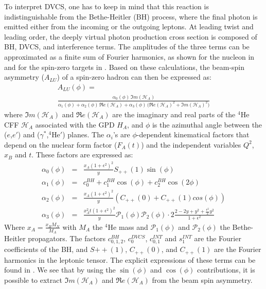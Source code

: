 \documentclass[preprint,nofootinbib,showpacs,prl,superscriptaddress,secnumarabic,amssymb,nobibnotes,aps,floatfix]{revtex4}
\begin{document}
To interpret DVCS, one has to keep in mind that this reaction is 
indistinguishable from the Bethe-Heitler (BH) process, where the final photon 
is emitted either from the incoming or the outgoing leptons. At leading twist 
and leading order, the deeply virtual photon production cross section is 
composed of BH, DVCS, and interference terms. The amplitudes of the 
three terms can be approximated as a finite sum of Fourier harmonics, as shown 
for the nucleon in \cite{Belitsky:2001ns} and for the spin-zero targets in 
\cite{Kirchner:2003wt,Belitsky:2008bz}. Based on these calculations, the 
beam-spin asymmetry ($A_{LU}$) of a spin-zero hadron can then be expressed as:
\small
\begin{equation}
\begin{split}
A_{LU}(\phi) =~~~~~~~~~~~~~~~~~~~~~~~~~~~~~~~~~~~~~~~~~~~~~~~~~~~~~~~~~\\
 \frac{\alpha_{0}(\phi) \, \Im m(\mathcal{H}_{A})}
{\alpha_{1}(\phi) + \alpha_{2}(\phi) \, \Re e(\mathcal{H}_{A}) + \alpha_{3}(\phi) \, 
\big( 
\Re e(\mathcal{H}_{A})^{2} + \Im m(\mathcal{H}_{A})^{2} \big)}
\label{eq:A_LU-coh}
\end{split}
\end{equation}
\normalsize
where $\Im m(\mathcal{H}_{A})$ and $\Re e(\mathcal{H}_{A})$ are the imaginary 
and real parts of the $^4$He CFF $\mathcal{H}_{A}$ associated with the GPD $H_A$,
and $\phi$ is the azimuthal angle between the ($e$,$e'$) and 
($\gamma^{*}$,$^4$He$'$) planes. The $\alpha_{i}$'s are $\phi$-dependent 
kinematical factors that depend on the nuclear form factor ($F_{A}(t)$) and the 
independent variables $Q^2$, $x_{B}$ and $t$. These factors are expressed as:
\small
\begin{eqnarray}
   \alpha_0 (\phi) & = &\frac{x_{A}(1+\epsilon^2)^2}{y} S_{++}(1) \sin(\phi)\\
    \alpha_1 (\phi) & = & c_0^{BH}+c_1^{BH} \cos({\phi})+c_2^{BH} \cos(2\phi)\\ 
   \alpha_2 (\phi) & = & \frac{x_{A}(1+\epsilon^2)^2}{y}  \left( C_{++}(0) +  
C_{++}(1) cos(\phi) \right)\\
\alpha_3 (\phi) &=& \frac{x^{2}_{A}t(1+\epsilon^2)^2}{y} {\mathcal P}_1(\phi) 
{\mathcal P}_2(\phi) \cdot 2 \frac{2-2y+y^2 + \frac{\epsilon^2}{2}y^2}{1 + 
\epsilon^2}
\end{eqnarray}
\normalsize
Where $x_{A} = \frac{x_{B}M_{N}}{M_{A}}$ with $M_{A}$ the $^4$He mass and 
$\mathcal{P}_1(\phi)$ and $\mathcal {P}_2(\phi)$ the Bethe-Heitler
propagators. The factors $c_{0,1,2}^{BH}$, $c_0^{DVCS}$, $c_{0,1}^{INT}$ and
$s_1^{INT}$ are the Fourier coefficients of the BH, and $S{++}(1)$, $C_{++}(0)$, 
and $C_{++}(1)$ are the Fourier harmonics in the leptonic tensor. The 
explicit expressions of these terms can be found in \cite{Belitsky:2008bz}. 
We see that by using the $\sin(\phi)$ and $\cos(\phi)$ contributions, it is 
possible to extract 
$\Im m(\mathcal{H}_{A})$ and $\Re e(\mathcal{H}_{A})$ from the beam spin
asymmetry. 
\end{document}
